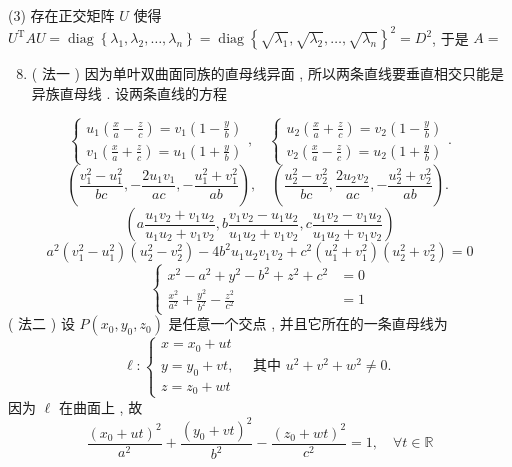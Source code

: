 \documentclass[10pt]{article}
\begin{document}
(3)  存在正交矩阵  $U$  使得  $U^{\mathrm{T}} A U=\operatorname{diag}\left\{\lambda_{1}, \lambda_{2}, \ldots, \lambda_{n}\right\}=\operatorname{diag}\left\{\sqrt{\lambda_{1}}, \sqrt{\lambda_{2}}, \ldots, \sqrt{\lambda_{n}}\right\}^{2}=D^{2}$,  于是  $A=$

\begin{enumerate}
  \setcounter{enumi}{7}
  \item ( 法一 )  因为单叶双曲面同族的直母线异面 ,  所以两条直线要垂直相交只能是异族直母线 .  设两条直线的方程 
\end{enumerate}
$$
\left\{\begin{array}{l}
u_{1}\left(\frac{x}{a}-\frac{z}{c}\right)=v_{1}\left(1-\frac{y}{b}\right) \\
v_{1}\left(\frac{x}{a}+\frac{z}{c}\right)=u_{1}\left(1+\frac{y}{b}\right)
\end{array}, \quad\left\{\begin{array}{l}
u_{2}\left(\frac{x}{a}+\frac{z}{c}\right)=v_{2}\left(1-\frac{y}{b}\right) \\
v_{2}\left(\frac{x}{a}-\frac{z}{c}\right)=u_{2}\left(1+\frac{y}{b}\right)
\end{array} .\right.\right.
$$
$$
\left(\frac{v_{1}^{2}-u_{1}^{2}}{b c},-\frac{2 u_{1} v_{1}}{a c},-\frac{u_{1}^{2}+v_{1}^{2}}{a b}\right), \quad\left(\frac{u_{2}^{2}-v_{2}^{2}}{b c}, \frac{2 u_{2} v_{2}}{a c},-\frac{u_{2}^{2}+v_{2}^{2}}{a b}\right) \text {. }
$$
$$
\left(a \frac{u_{1} v_{2}+v_{1} u_{2}}{u_{1} u_{2}+v_{1} v_{2}}, b \frac{v_{1} v_{2}-u_{1} u_{2}}{u_{1} u_{2}+v_{1} v_{2}}, c \frac{u_{1} v_{2}-v_{1} u_{2}}{u_{1} u_{2}+v_{1} v_{2}}\right)
$$
$$
a^{2}\left(v_{1}^{2}-u_{1}^{2}\right)\left(u_{2}^{2}-v_{2}^{2}\right)-4 b^{2} u_{1} u_{2} v_{1} v_{2}+c^{2}\left(u_{1}^{2}+v_{1}^{2}\right)\left(u_{2}^{2}+v_{2}^{2}\right)=0
$$
$$
\left\{\begin{aligned}
x^{2}-a^{2}+y^{2}-b^{2}+z^{2}+c^{2} &=0 \\
\frac{x^{2}}{a^{2}}+\frac{y^{2}}{b^{2}}-\frac{z^{2}}{c^{2}} &=1
\end{aligned}\right.
$$
( 法二 )  设  $P\left(x_{0}, y_{0}, z_{0}\right)$  是任意一个交点 ,  并且它所在的一条直母线为 
$$
\ell:\left\{\begin{array}{l}
x=x_{0}+u t \\
y=y_{0}+v t, \quad \text { 其中 } u^{2}+v^{2}+w^{2} \neq 0 . \\
z=z_{0}+w t
\end{array}\right.
$$
 因为  $\ell$  在曲面上 ,  故 
$$
\frac{\left(x_{0}+u t\right)^{2}}{a^{2}}+\frac{\left(y_{0}+v t\right)^{2}}{b^{2}}-\frac{\left(z_{0}+w t\right)^{2}}{c^{2}}=1, \quad \forall t \in \mathbb{R}
$$
\end{document}

